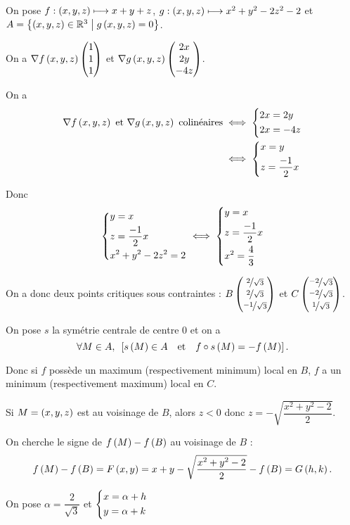 \begin{corr}
On pose \(f:\left(x,y,z\right)\longmapsto x+y+z\), \(g:\left(x,y,z\right)\longmapsto x^2+y^2-2z^2-2\) et \(A=\left\lbrace\left(x,y,z\right)\in\mathbb{R}^3\;\middle|\; g\left(x,y,z\right)=0\right\rbrace\).

On a \(\nabla f\left(x,y,z\right)\begin{pmatrix}1\\1\\1\end{pmatrix}\) et \(\nabla g\left(x,y,z\right)\begin{pmatrix}2x\\2y\\-4z\end{pmatrix}\).

On a \[\begin{aligned}
\nabla f\left(x,y,z\right)\text{ et }\nabla g\left(x,y,z\right)\text{ colinéaires}&\iff\begin{dcases}
2x=2y \\
2x=-4z
\end{dcases} \\
&\iff\begin{dcases}
x=y \\
z=\dfrac{-1}{2}x
\end{dcases}
\end{aligned}\]

Donc \[\begin{dcases}
y=x \\
z=\dfrac{-1}{2}x \\
x^2+y^2-2z^2=2
\end{dcases}\iff\begin{dcases}
y=x \\
z=\dfrac{-1}{2}x \\
x^2=\dfrac{4}{3}
\end{dcases}\]

On a donc deux points critiques sous contraintes : \(B\begin{pmatrix}\nicefrac{2}{\sqrt{3}}\\\nicefrac{2}{\sqrt{3}}\\\nicefrac{-1}{\sqrt{3}}\end{pmatrix}\) et \(C\begin{pmatrix}\nicefrac{-2}{\sqrt{3}}\\\nicefrac{-2}{\sqrt{3}}\\\nicefrac{1}{\sqrt{3}}\end{pmatrix}\).

On pose \(s\) la symétrie centrale de centre \(0\) et on a \[\quantifs{\forall M\in A}\croch{s\paren{M}\in A\quad\text{et}\quad f\rond s\paren{M}=-f\paren{M}}.\]

Donc si \(f\) possède un maximum (respectivement minimum) local en \(B\), \(f\) a un minimum (respectivement maximum) local en \(C\).

Si \(M=\left(x,y,z\right)\) est au voisinage de \(B\), alors \(z<0\) donc \(z=-\sqrt{\dfrac{x^2+y^2-2}{2}}\).

On cherche le signe de \(f\left(M\right)-f\left(B\right)\) au voisinage de \(B\) : \[f\left(M\right)-f\left(B\right)=F\left(x,y\right)=x+y-\sqrt{\dfrac{x^2+y^2-2}{2}}-f\left(B\right)=G\left(h,k\right).\]

On pose \(\alpha=\dfrac{2}{\sqrt{3}}\) et \(\begin{dcases}
x=\alpha+h \\
y=\alpha+k
\end{dcases}\)


\end{corr}

